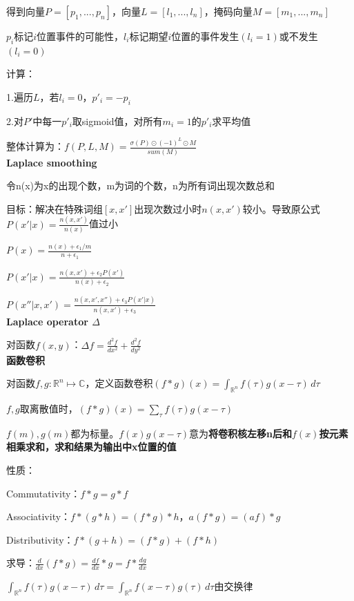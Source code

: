 \documentclass[UTF8]{ctexart}
\begin{document}
  得到向量$P = [p_1, ..., p_n]$，向量$L = [l_1, ..., l_n]$，掩码向量$M = [m_1, ..., m_n]$

  \quad $p_i$标记$i$位置事件的可能性，$l_i$标记期望$i$位置的事件发生$(l_i = 1)$或不发生$(l_i = 0)$

  计算：

  \quad 1.遍历$L$，若$l_i = 0$，$p'_i = -p_i$

  \quad 2.对$P'$中每一$p'_i$取sigmoid值，对所有$m_i = 1$的$p'_i$求平均值

  整体计算为：$f(P, L, M) = \frac{\sigma(P) \odot (-1)^L \odot M}{sum(M)}$\\
\textbf{Laplace smoothing}

  令n(x)为x的出现个数，m为词的个数，n为所有词出现次数总和
  
  \quad 目标：解决在特殊词组$[x, x']$出现次数过小时$n(x, x')$较小。导致原公式$P(x' | x) = \frac{n(x, x')}{n(x)}$值过小
    
  $P(x) = \frac{n(x) + \epsilon_1 / m}{n + \epsilon_1}$

  $P(x' | x) = \frac{n(x, x') + \epsilon_2 P(x')}{n(x) + \epsilon_2}$

  $P(x'' | x, x') = \frac{n(x, x', x'') + \epsilon_3 P(x' | x)}{n(x, x') + \epsilon_3}$\\
\textbf{Laplace operator $\Delta$}

  对函数$f(x, y)$：$\Delta f = \frac{d^2f}{dx^2} + \frac{d^2f}{dy^2}$\\
\textbf{函数卷积}

  对函数$f, g : \mathbb{R}^n \mapsto \mathbb{C}$，定义函数卷积$(f * g)(x) = \int_{\mathbb{R}^n} f(\tau)g(x - \tau) \,d\tau$

  \quad $f, g$取离散值时，$(f * g)(x) = \sum_\tau f(\tau)g(x - \tau)$

  \quad $f(m), g(m)$都为标量。$f(x)g(x - \tau)$意为\textbf{将卷积核左移n后和$f(x)$按元素相乘求和，求和结果为输出中x位置的值}

  性质：

  \quad Commutativity：$f * g = g * f$
  
  \quad Associativity：$f * (g * h) = (f * g) * h$，$a(f * g) = (af) * g$
  
  \quad Distributivity：$f * (g + h) = (f * g) + (f * h)$
  
  \quad 求导：$\frac{d }{dx}(f * g) = \frac{d f}{dx} * g = f * \frac{dg}{dx}$
  
  \quad $\int_{\mathbb{R}^n} f(\tau)g(x - \tau) \,d\tau = \int_{\mathbb{R}^n} f(x - \tau)g(\tau) \,d\tau$由交换律
  
\end{document}
